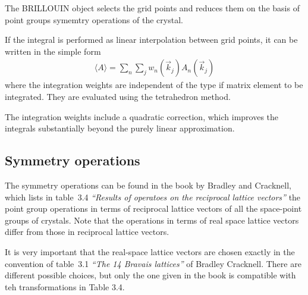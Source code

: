 \documentclass[11pt,a4paper]{report}
\begin{document}
The BRILLOUIN object selects the grid points and reduces them on the
basis of point groups symemtry operations of the crystal.

If the integral is performed as linear interpolation between grid
points, it can be written in the simple form
\begin{eqnarray}
\langle A\rangle=\sum_n\sum_{j} w_n(\vec{k}_j) A_n(\vec{k}_j)
\end{eqnarray}
where the integration weights are independent of the type if matrix
element to be integrated.\cite{bloechl94_prb49_16223} They are
evaluated using the tetrahedron method.

The integration weights include a quadratic correction, which improves
the integrals substantially beyond the purely linear
approximation.\cite{bloechl94_prb49_16223}

\subsection{Symmetry operations}
The symmetry operations can be found in the book by Bradley and
Cracknell\cite{bradley72_book}, which lists in table~3.4
\textit{``Results of operatoes on the reciprocal lattice vectors''}
the point group operations in terms of reciprocal lattice vectors of
all the space-point groups of crystals. Note that the operations in
terms of real space lattice vectors differ from those in reciprocal
lattice vectors.

It is very important that the real-space lattice vectors are chosen
exactly in the convention of table~3.1 \textit{``The 14 Bravais
  lattices''} of Bradley Cracknell. There are different possible
choices, but only the one given in the book is compatible with teh
transformations in Table 3.4.

\end{document}
